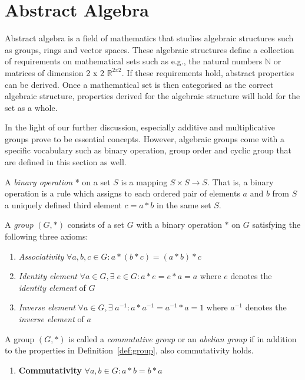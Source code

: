 \section{Abstract Algebra}
Abstract algebra is a field of mathematics that studies algebraic structures such as groups, rings and vector spaces. These algebraic structures define a collection of requirements on mathematical sets such as e.g., the natural numbers $\mathbb{N}$ or matrices of dimension 2 x 2 $\mathbb{R}^{2 x 2}$. If these requirements hold, abstract properties can be derived. Once a mathematical set is then categorised as the correct algebraic structure, properties derived for the algebraic structure will hold for the set as a whole.

In the light of our further discussion, especially additive and multiplicative groups prove to be essential concepts. However, algebraic groups come with a specific vocabulary such as binary operation, group order and cyclic group that are defined in this section as well.

\begin{defn}
 A \textit{binary operation} * on a set $S$ is a mapping $S \times S \rightarrow S$. That is, a binary operation is a rule which assigns to each ordered pair of elements $a$ and $b$ from $S$ a uniquely defined third element $c = a*b$ in the same set $S$.~\cite{book:survey_of_modern_algebra,book:handbook_of_applied_cryptography}
\end{defn}

\begin{defn}[Group]
\label{def:group}
 A \textit{group} $\left( G, * \right)$ consists of a set $G$ with a binary operation $*$ on $G$ satisfying the following three axioms:
 \begin{enumerate}
  \item \textit{Associativity} $\forall a, b, c \in G: a*(b*c) = (a*b)*c$
  \item \textit{Identity element} $\forall a \in G, \exists \; e \in G: a*e = e*a = a $ where $e$ denotes the \textit{identity element} of $G$
  \item \textit{Inverse element} $\forall a \in G, \exists \; a^{-1}: a*a^{-1} = a^{-1}*a = 1$ where $a^{-1}$ denotes the \textit{inverse element} of $a$
  \setcounter{enumTemp}{\theenumi}
 \end{enumerate}

\end{defn}

\begin{defn}
 A group $\left( G, * \right)$ is called a \textit{commutative group} or an \textit{abelian group} if in addition to the properties in Definition~\ref{def:group}, also commutativity holds.
 \begin{enumerate}
  \setcounter{enumi}{\theenumTemp}
  \item \textbf{Commutativity} $\forall a, b \in G: a*b = b*a$
 \end{enumerate}

\end{defn}

